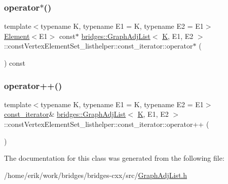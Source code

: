 \subsubsection{\texorpdfstring{operator$\ast$()}{operator*()}}
{\footnotesize\ttfamily template$<$typename K, typename E1 = K, typename E2 = E1$>$ \\
\hyperlink{classbridges_1_1_element}{Element}$<$E1$>$ const$\ast$ \hyperlink{classbridges_1_1_graph_adj_list}{bridges\+::\+Graph\+Adj\+List}$<$ \hyperlink{namespacebridges_acfb0a4f7877d8f63de3e6862004c50edaa5f3c6a11b03839d46af9fb43c97c188}{K}, E1, E2 $>$\+::const\+Vertex\+Element\+Set\+\_\+listhelper\+::const\+\_\+iterator\+::operator$\ast$ (\begin{DoxyParamCaption}{ }\end{DoxyParamCaption}) const\hspace{0.3cm}{\ttfamily [inline]}}

\mbox{\label{classbridges_1_1_graph_adj_list_1_1const_vertex_element_set__listhelper_1_1const__iterator_a3c654115a3c563a3a8b3b4613bddd763}} 
\subsubsection{\texorpdfstring{operator++()}{operator++()}}
{\footnotesize\ttfamily template$<$typename K, typename E1 = K, typename E2 = E1$>$ \\
\hyperlink{classbridges_1_1_graph_adj_list_1_1const_vertex_element_set__listhelper_1_1const__iterator}{const\+\_\+iterator}\& \hyperlink{classbridges_1_1_graph_adj_list}{bridges\+::\+Graph\+Adj\+List}$<$ \hyperlink{namespacebridges_acfb0a4f7877d8f63de3e6862004c50edaa5f3c6a11b03839d46af9fb43c97c188}{K}, E1, E2 $>$\+::const\+Vertex\+Element\+Set\+\_\+listhelper\+::const\+\_\+iterator\+::operator++ (\begin{DoxyParamCaption}{ }\end{DoxyParamCaption})\hspace{0.3cm}{\ttfamily [inline]}}



The documentation for this class was generated from the following file\+:\begin{DoxyCompactItemize}
\item 
/home/erik/work/bridges/bridges-\/cxx/src/\hyperlink{_graph_adj_list_8h}{Graph\+Adj\+List.\+h}\end{DoxyCompactItemize}
